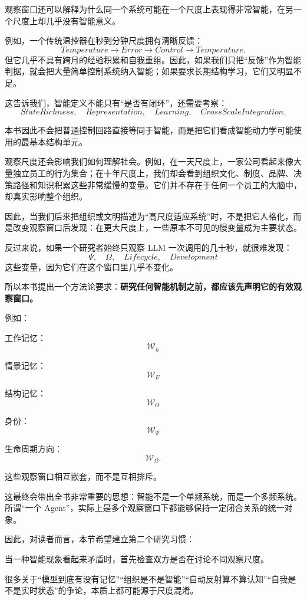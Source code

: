 观察窗口还可以解释为什么同一个系统可能在一个尺度上表现得非常智能，在另一个尺度上却几乎没有智能意义。

例如，一个传统温控器在秒到分钟尺度拥有清晰反馈：
\[
Temperature
\rightarrow
Error
\rightarrow
Control
\rightarrow
Temperature.
\]
但它几乎不具有跨月的经验积累和自我重组。因此，如果我们只把“反馈”作为智能判据，就会把大量简单控制系统纳入智能；如果要求长期结构学习，它们又明显不足。

这告诉我们，智能定义不能只有“是否有闭环”，还需要考察：
\[
StateRichness,
\quad
Representation,
\quad
Learning,
\quad
CrossScaleIntegration.
\]

本书因此不会把普通控制回路直接等同于智能，而是把它们看成智能动力学可能使用的最基本结构单元。

观察尺度还会影响我们如何理解社会。例如，在一天尺度上，一家公司看起来像大量独立员工的行为集合；在十年尺度上，我们却会看到组织文化、制度、品牌、决策路径和知识积累这些非常缓慢的变量。它们并不存在于任何一个员工的大脑中，却真实影响整个组织。

因此，当我们后来把组织或文明描述为“高尺度适应系统”时，不是把它人格化，而是改变观察窗口后发现：在更大尺度上，一些原本不可见的慢变量成为主要状态。

反过来说，如果一个研究者始终只观察 LLM 一次调用的几十秒，就很难发现：
\[
\Psi,\quad
\Omega,\quad
Lifecycle,\quad
Development
\]
这些变量，因为它们在这个窗口里几乎不变化。

所以本书提出一个方法论要求：\textbf{研究任何智能机制之前，都应该先声明它的有效观察窗口。}

例如：

工作记忆：
\[
\mathcal W_h
\]

情景记忆：
\[
\mathcal W_E
\]

结构记忆：
\[
\mathcal W_\Theta
\]

身份：
\[
\mathcal W_\Psi
\]

生命周期方向：
\[
\mathcal W_\Omega.
\]

这些观察窗口相互嵌套，而不是互相排斥。

这最终会带出全书非常重要的思想：智能不是一个单频系统，而是一个多频系统。所谓“一个 Agent”，实际上是多个观察窗口下都能够保持一定闭合关系的统一对象。

因此，对读者而言，本节希望建立第二个研究习惯：

\begin{statementbox}
当一种智能现象看起来矛盾时，首先检查双方是否在讨论不同观察尺度。
\end{statementbox}

很多关于“模型到底有没有记忆”“组织是不是智能”“自动反射算不算认知”“自我是不是实时状态”的争论，本质上都可能源于尺度混淆。

